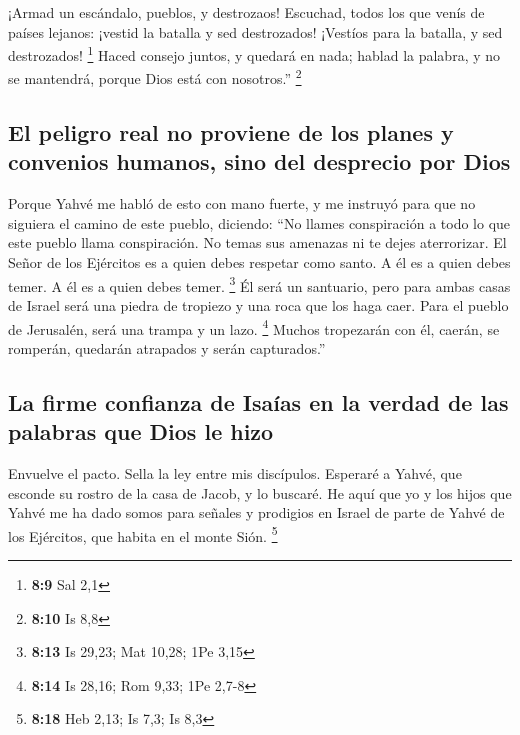  ¡Armad un escándalo, pueblos, y destrozaos! Escuchad,
todos los que venís de países lejanos: ¡vestid la batalla y sed
destrozados! ¡Vestíos para la batalla, y sed destrozados! \footnote{\textbf{8:9}
  Sal 2,1}  Haced consejo juntos, y quedará en nada;
hablad la palabra, y no se mantendrá, porque Dios está con nosotros.''
\footnote{\textbf{8:10} Is 8,8}

\hypertarget{el-peligro-real-no-proviene-de-los-planes-y-convenios-humanos-sino-del-desprecio-por-dios}{%
\subsection{El peligro real no proviene de los planes y convenios
humanos, sino del desprecio por
Dios}\label{el-peligro-real-no-proviene-de-los-planes-y-convenios-humanos-sino-del-desprecio-por-dios}}

 Porque Yahvé me habló de esto con mano fuerte, y me
instruyó para que no siguiera el camino de este pueblo, diciendo:
 ``No llames conspiración a todo lo que este pueblo llama
conspiración. No temas sus amenazas ni te dejes aterrorizar.
 El Señor de los Ejércitos es a quien debes respetar como
santo. A él es a quien debes temer. A él es a quien debes temer.
\footnote{\textbf{8:13} Is 29,23; Mat 10,28; 1Pe 3,15} 
Él será un santuario, pero para ambas casas de Israel será una piedra de
tropiezo y una roca que los haga caer. Para el pueblo de Jerusalén, será
una trampa y un lazo. \footnote{\textbf{8:14} Is 28,16; Rom 9,33; 1Pe
  2,7-8}  Muchos tropezarán con él, caerán, se romperán,
quedarán atrapados y serán capturados.''

\hypertarget{la-firme-confianza-de-isauxedas-en-la-verdad-de-las-palabras-que-dios-le-hizo}{%
\subsection{La firme confianza de Isaías en la verdad de las palabras
que Dios le
hizo}\label{la-firme-confianza-de-isauxedas-en-la-verdad-de-las-palabras-que-dios-le-hizo}}

 Envuelve el pacto. Sella la ley entre mis discípulos.
 Esperaré a Yahvé, que esconde su rostro de la casa de
Jacob, y lo buscaré.  He aquí que yo y los hijos que
Yahvé me ha dado somos para señales y prodigios en Israel de parte de
Yahvé de los Ejércitos, que habita en el monte Sión. \footnote{\textbf{8:18}
  Heb 2,13; Is 7,3; Is 8,3}

